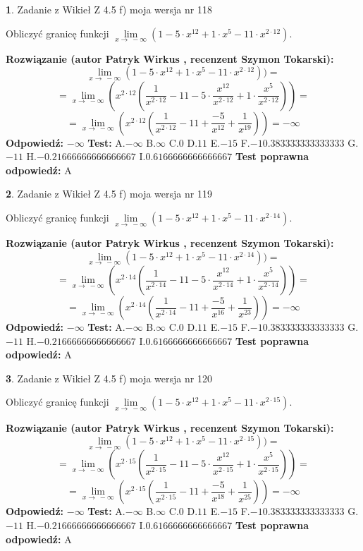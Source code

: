 \documentclass[12pt, a4paper]{article}
\theoremstyle{definition} %
\newtheorem{zad}{}
\newcommand{\zadStart}[1]{\begin{zad}#1\newline}
\newcommand{\zadStop}{\end{zad}}
\newcommand{\rozwStart}[2]{\noindent \textbf{Rozwiązanie (autor #1 , recenzent #2): }\newline}
\newcommand{\rozwStop}{\newline}
\newcommand{\odpStart}{\noindent \textbf{Odpowiedź:}\newline}
\newcommand{\odpStop}{\newline}
\newcommand{\testStart}{\noindent \textbf{Test:}\newline}
\newcommand{\testStop}{\newline}
\newcommand{\kluczStart}{\noindent \textbf{Test poprawna odpowiedź:}\newline}
\newcommand{\kluczStop}{\newline}
\begin{document}
\zadStart{Zadanie z Wikieł Z 4.5 f) moja wersja nr 118}


Obliczyć granicę funkcji  $\lim\limits_{x\to\ -\infty}(1 - 5 \cdot x^{12}+1 \cdot x^{5}- 11 \cdot x^{2\cdot12})$.
\zadStop
\rozwStart{Patryk Wirkus}{Szymon Tokarski}
$$\lim\limits_{x\to\ -\infty}(1 - 5 \cdot x^{12}+1 \cdot x^{5}- 11 \cdot x^{2\cdot12}))=$$
$$=\lim\limits_{x\to\ -\infty}(x^{2\cdot12}(\frac{1}{x^{2\cdot12}}-11 -5 \cdot \frac{x^{12}}{x^{2\cdot12}}+1 \cdot \frac{x^{5}}{x^{2\cdot12}}))=$$
$$=\lim\limits_{x\to\ -\infty}(x^{2\cdot12}(\frac{1}{x^{2\cdot12}}-11 + \frac{-5}{x^{12}}+ \frac{1}{x^{19}}))=-\infty$$
\rozwStop
\odpStart
$-\infty$
\odpStop
\testStart
A.$-\infty$ B.$\infty$ C.$0$ D.$11$ E.$-15$
F.$-10.383333333333333$ G.$-11$
H.$-0.21666666666666667$
I.$0.6166666666666667$
\testStop
\kluczStart
A
\kluczStop



\zadStart{Zadanie z Wikieł Z 4.5 f) moja wersja nr 119}


Obliczyć granicę funkcji  $\lim\limits_{x\to\ -\infty}(1 - 5 \cdot x^{12}+1 \cdot x^{5}- 11 \cdot x^{2\cdot14})$.
\zadStop
\rozwStart{Patryk Wirkus}{Szymon Tokarski}
$$\lim\limits_{x\to\ -\infty}(1 - 5 \cdot x^{12}+1 \cdot x^{5}- 11 \cdot x^{2\cdot14}))=$$
$$=\lim\limits_{x\to\ -\infty}(x^{2\cdot14}(\frac{1}{x^{2\cdot14}}-11 -5 \cdot \frac{x^{12}}{x^{2\cdot14}}+1 \cdot \frac{x^{5}}{x^{2\cdot14}}))=$$
$$=\lim\limits_{x\to\ -\infty}(x^{2\cdot14}(\frac{1}{x^{2\cdot14}}-11 + \frac{-5}{x^{16}}+ \frac{1}{x^{23}}))=-\infty$$
\rozwStop
\odpStart
$-\infty$
\odpStop
\testStart
A.$-\infty$ B.$\infty$ C.$0$ D.$11$ E.$-15$
F.$-10.383333333333333$ G.$-11$
H.$-0.21666666666666667$
I.$0.6166666666666667$
\testStop
\kluczStart
A
\kluczStop



\zadStart{Zadanie z Wikieł Z 4.5 f) moja wersja nr 120}


Obliczyć granicę funkcji  $\lim\limits_{x\to\ -\infty}(1 - 5 \cdot x^{12}+1 \cdot x^{5}- 11 \cdot x^{2\cdot15})$.
\zadStop
\rozwStart{Patryk Wirkus}{Szymon Tokarski}
$$\lim\limits_{x\to\ -\infty}(1 - 5 \cdot x^{12}+1 \cdot x^{5}- 11 \cdot x^{2\cdot15}))=$$
$$=\lim\limits_{x\to\ -\infty}(x^{2\cdot15}(\frac{1}{x^{2\cdot15}}-11 -5 \cdot \frac{x^{12}}{x^{2\cdot15}}+1 \cdot \frac{x^{5}}{x^{2\cdot15}}))=$$
$$=\lim\limits_{x\to\ -\infty}(x^{2\cdot15}(\frac{1}{x^{2\cdot15}}-11 + \frac{-5}{x^{18}}+ \frac{1}{x^{25}}))=-\infty$$
\rozwStop
\odpStart
$-\infty$
\odpStop
\testStart
A.$-\infty$ B.$\infty$ C.$0$ D.$11$ E.$-15$
F.$-10.383333333333333$ G.$-11$
H.$-0.21666666666666667$
I.$0.6166666666666667$
\testStop
\kluczStart
A
\kluczStop
\end{document}
